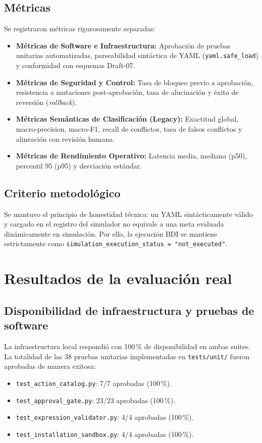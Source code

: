 \documentclass[11pt,a4paper]{article}
\begin{document}
\subsection{Métricas}
Se registraron métricas rigurosamente separadas:
\begin{itemize}[leftmargin=*]
    \item \textbf{Métricas de Software e Infraestructura:} Aprobación de pruebas unitarias automatizadas, parseabilidad sintáctica de YAML (\texttt{yaml.safe\_load}) y conformidad con esquemas Draft-07.
    \item \textbf{Métricas de Seguridad y Control:} Tasa de bloqueo previo a aprobación, resistencia a mutaciones post-aprobación, tasa de alucinación y éxito de reversión (\textit{rollback}).
    \item \textbf{Métricas Semánticas de Clasificación (Legacy):} Exactitud global, macro-precision, macro-F1, recall de conflictos, tasa de falsos conflictos y alineación con revisión humana.
    \item \textbf{Métricas de Rendimiento Operativo:} Latencia media, mediana (p50), percentil 95 (p95) y desviación estándar.
\end{itemize}

\subsection{Criterio metodológico}
Se mantuvo el principio de honestidad técnica: un YAML sintácticamente válido y cargado en el registro del simulador no equivale a una meta evaluada dinámicamente en simulación. Por ello, la ejecución BDI se mantiene estrictamente como \texttt{simulation\_execution\_status = "not\_executed"}.

\section{Resultados de la evaluación real}

\subsection{Disponibilidad de infraestructura y pruebas de software}
La infraestructura local respondió con 100\,\% de disponibilidad en ambas suites. La totalidad de las 38 pruebas unitarias implementadas en \texttt{tests/unit/} fueron aprobadas de manera exitosa:
\begin{itemize}[leftmargin=*]
    \item \texttt{test\_action\_catalog.py}: 7/7 aprobadas (100\,\%).
    \item \texttt{test\_approval\_gate.py}: 23/23 aprobadas (100\,\%).
    \item \texttt{test\_expression\_validator.py}: 4/4 aprobadas (100\,\%).
    \item \texttt{test\_installation\_sandbox.py}: 4/4 aprobadas (100\,\%).
\end{itemize}
\end{document}
